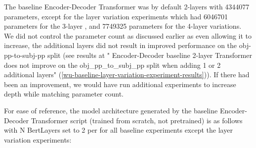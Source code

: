 \documentclass[11pt]{article}
\begin{document}
The baseline \citep{Wu2023} Encoder-Decoder Transformer was by default 2-layers with 4344077 parameters,
except for the layer variation experiments which had 6046701 parameters for the 3-layer , and 7749325 parameters for the 4-layer variations.
We did not control the parameter count as discussed earlier as even allowing it to increase, the additional layers did not result in improved performance on the obj-pp-to-subj-pp split (see results at "\citep{Wu2023} Encoder-Decoder baseline 2-layer Transformer does not improve on the obj\_pp\_to\_subj\_pp split when adding 1 or 2 additional layers" (\ref{wu-baseline-layer-variation-experiment-results})). If there had been an improvement, we would have run additional experiments to increase depth while matching parameter count.

For ease of reference, the model architecture generated by the \citep{Wu2023} baseline Encoder-Decoder Transformer script (trained from scratch, not pretrained) is as follows with N BertLayers set to 2 per \citep{Wu2023} for all baseline experiments except the layer variation experiments:
\end{document}
